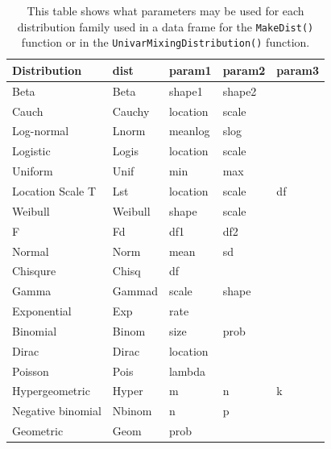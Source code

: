 \documentclass[11pt,notitlepage]{isuthesis}
\begin{document}
\begin{table}
\begin{center}
    \begin{tabular}{ l l  p{2cm}  p{2cm}  p{2cm}}
    \hline
    \textbf{Distribution} & \textbf{dist} & \textbf{param1} & \textbf{param2} &
    \textbf{param3} \newline \\ \hline
    Beta & Beta & shape1 & shape2 &  \\
    Cauch & Cauchy & location & scale &  \\
    Log-normal & Lnorm & meanlog & slog &  \\
    Logistic & Logis & location & scale &  \\
    Uniform & Unif & min & max &  \\
    Location Scale T & Lst & location & scale & df \\
    Weibull & Weibull & shape & scale &  \\
    F & Fd & df1 & df2 &  \\
    Normal & Norm & mean & sd &  \\
    Chisqure & Chisq & df &  &  \\
    Gamma & Gammad & scale & shape &  \\
    Exponential & Exp & rate &  &  \\
    Binomial & Binom & size & prob &  \\
    Dirac & Dirac & location &  &  \\
    Poisson & Pois & lambda &  &  \\
    Hypergeometric & Hyper & m & n & k \\
    Negative binomial & Nbinom & n & p &  \\
    Geometric & Geom & prob &  &  \\ \hline
    \end{tabular}
        \begin{center}
\begin{minipage}{10cm}
\captionsetup{font=scriptsize}
  \caption[\texttt{MakeDist()} parameters]{This table shows what parameters
  may be used for each distribution family used in a data frame for
  the \texttt{MakeDist()} function or in the 
  \texttt{UnivarMixingDistribution()} function.}
  \label{table:mixfamsparams}
  \end{minipage}
  \end{center}
\end{center}
\end{table}
\end{document}
